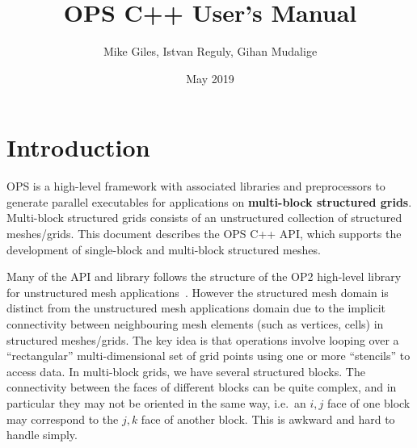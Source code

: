 \documentclass[11pt]{article}
\date{May 2019}
\begin{document}
\title{OPS C++ User's Manual}
\author{Mike Giles, Istvan Reguly, Gihan Mudalige}
\maketitle

\newpage


\tableofcontents




\newpage
\section{Introduction}


OPS is a high-level framework with associated libraries and preprocessors to generate parallel executables for
applications on \textbf{multi-block structured grids}. Multi-block structured grids consists of an unstructured
collection of structured meshes/grids. This document describes the OPS C++ API, which supports the development
of single-block and multi-block structured meshes.

Many of the API and library follows the structure of the OP2 high-level library for unstructured mesh
applications~\cite{op2}. However the structured mesh domain is distinct from the unstructured mesh applications domain
due to the implicit connectivity between neighbouring mesh elements (such as vertices, cells) in structured
meshes/grids. The key idea is that operations involve looping over a ``rectangular'' multi-dimensional set of grid
points using one or more ``stencils'' to access data. In multi-block grids, we have several structured blocks.  The 
connectivity between the faces of different blocks can be quite complex, and in particular they may not be oriented in 
the same way, i.e.~an $i,j$ face of one block may correspond to the $j,k$ face of another block.  This is awkward and 
hard to handle simply.
\end{document}
